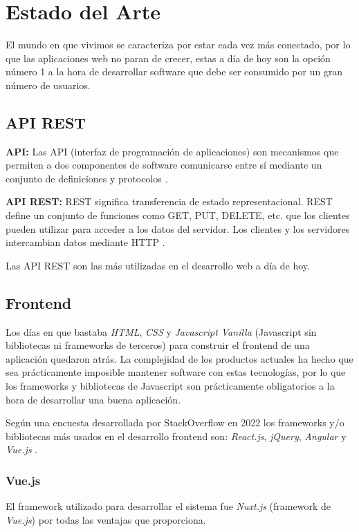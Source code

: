 \chapter{Estado del Arte}\label{chapter:state-of-the-art}

El mundo en que vivimos se caracteriza por estar cada vez más conectado, por lo que las aplicaciones web no paran de crecer, estas a día de hoy son la opción número 1 a la hora de desarrollar software que debe ser consumido por un gran número de usuarios.

\section{API REST}
\textbf{API:} Las API (interfaz de programación de aplicaciones) son mecanismos que permiten a dos componentes de software comunicarse entre sí mediante un conjunto de definiciones y protocolos \cite{apirest}.
\newline

\textbf{API REST:} REST significa transferencia de estado representacional. REST define un conjunto de funciones como GET, PUT, DELETE, etc. que los clientes pueden utilizar para acceder a los datos del servidor. Los clientes y los servidores intercambian datos mediante HTTP \cite{apirest}.
\newline

Las API REST son las más utilizadas en el desarrollo web a día de hoy.

\section{Frontend}
Los días en que bastaba \textit{HTML}, \textit{CSS} y \textit{Javascript Vanilla} (Javascript sin bibliotecas ni frameworks de terceros) para construir el frontend de una aplicación quedaron atrás. La complejidad de los productos actuales ha hecho que sea prácticamente imposible mantener software con estas tecnologías, por lo que los frameworks y bibliotecas de Javascript son prácticamente obligatorios a la hora de desarrollar una buena aplicación.
\newline

Según una encuesta desarrollada por StackOverflow en 2022 los frameworks y/o bibliotecas más usados en el desarrollo frontend son: \textit{React.js}, \textit{jQuery}, \textit{Angular} y \textit{Vue.js} \cite{encuesta2022}.

\subsection{Vue.js}
El framework utilizado para desarrollar el sistema fue \textit{Nuxt.js} (framework de \textit{Vue.js}) por todas las ventajas que proporciona.
\newline


